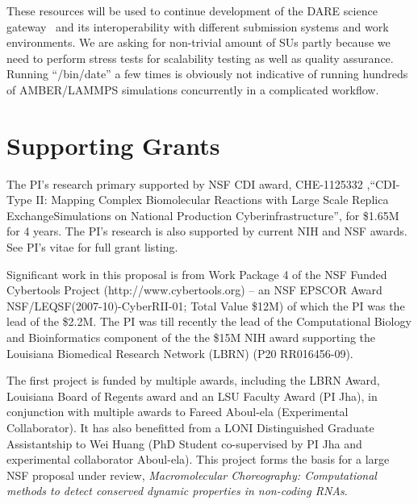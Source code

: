 \documentclass[a4paper,11pt]{article}
\newcommand{\up}{\vspace*{-1em}}
\begin{document}

These resources will be used to continue development of the DARE science gateway~\cite{dare-tg11} and its interoperability with different submission systems and work environments. We are asking for non-trivial amount of SUs partly because we need to perform stress tests for scalability testing as well as quality assurance. Running ``/bin/date'' a few times is obviously not indicative of running hundreds of AMBER/LAMMPS simulations concurrently in a complicated workflow.


\section{Supporting Grants}

The PI's research primary supported by NSF CDI award, CHE-1125332
,``CDI-Type II: Mapping Complex Biomolecular Reactions with Large
Scale Replica ExchangeSimulations on National Production
Cyberinfrastructure'', for \$1.65M for 4 years. The PI's research is
also supported by current NIH and NSF awards.  See PI's vitae for full
grant listing.

Significant work in this proposal is from Work Package 4 of the NSF Funded Cybertools Project (http://www.cybertools.org) -- an NSF EPSCOR Award NSF/LEQSF(2007-10)-CyberRII-01; Total Value \$12M) of which the PI was the lead of the \$2.2M. The PI was till recently the lead of the Computational Biology and Bioinformatics component of the the \$15M NIH award supporting the Louisiana Biomedical Research Network (LBRN) (P20 RR016456-09). %

The first project is funded by multiple awards, including the LBRN Award, Louisiana Board of Regents award and an LSU Faculty Award (PI Jha), in conjunction with multiple awards to Fareed Aboul-ela (Experimental Collaborator). It has also benefitted from a LONI Distinguished Graduate Assistantship to Wei Huang (PhD Student co-supervised by PI Jha and experimental collaborator Aboul-ela). This project forms the basis for a large NSF proposal under review, {\it Macromolecular Choreography: Computational methods to detect conserved dynamic properties in non-coding RNAs}.
\end{document}
